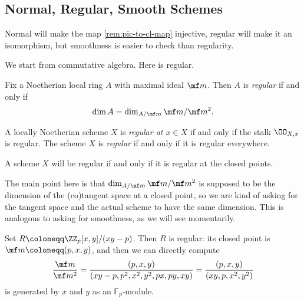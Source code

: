 \documentclass[../notes.tex]{subfiles}
\begin{document}
\subsection{Normal, Regular, Smooth Schemes}
Normal will make the map \autoref{rem:pic-to-cl-map} injective, regular will make it an isomorphism, but smoothness is easier to check than regularity.

We start from commutative algebra. Here is regular.
\begin{definition}[Regular]
	Fix a Noetherian local ring $A$ with maximal ideal $\mf m$. Then $A$ is \textit{regular} if and only if
	\[\dim A=\dim_{A/\mf m}\mf m/\mf m^2.\]
\end{definition}
\begin{definition}[Regular]
	A locally Noetherian scheme $X$ is \textit{regular at $x\in X$} if and only if the stalk $\OO_{X,x}$ is regular. The scheme $X$ is \textit{regular} if and only if it is regular everywhere.
\end{definition}
\begin{remark}
	A scheme $X$ will be regular if and only if it is regular at the closed points.
\end{remark}
\begin{remark}
	The main point here is that $\dim_{A/\mf m}\mf m/\mf m^2$ is supposed to be the dimension of the (co)tangent space at a closed point, so we are kind of asking for the tangent space and the actual scheme to have the same dimension. This is analogous to asking for smoothness, as we will see momentarily.
\end{remark}
\begin{example}
	Set $R\coloneqq\ZZ_p[x,y]/(xy-p)$. Then $R$ is regular: its closed point is $\mf m\coloneqq(p,x,y)$, and then we can directly compute
	\[\frac{\mf m}{\mf m^2}=\frac{(p,x,y)}{(xy-p,p^2,x^2,y^2,px,py,xy)}=\frac{(p,x,y)}{(xy,p,x^2,y^2)}\]
	is generated by $x$ and $y$ as an $\mathbb F_p$-module.
\end{example}
\end{document}
